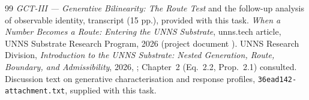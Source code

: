 \documentclass[11pt,a4paper]{article}
\theoremstyle{plain}
\theoremstyle{definition}
\begin{document}
\begin{thebibliography}{99}
 \emph{GCT-III --- Generative Bilinearity: The Route Test} and the follow-up analysis of observable identity, transcript  (15 pp.), provided with this task.
 \emph{When a Number Becomes a Route: Entering the UNNS Substrate}, unns.tech article, UNNS Substrate Research Program, 2026 (project document ).
 UNNS Research Division, \emph{Introduction to the UNNS Substrate: Nested Generation, Route, Boundary, and Admissibility}, 2026, ; Chapter~2 (Eq.~2.2, Prop.~2.1) consulted.
 Discussion text on generative characterisation and response profiles, \texttt{36ead142-attachment.txt}, supplied with this task.
\end{thebibliography}
\end{document}
